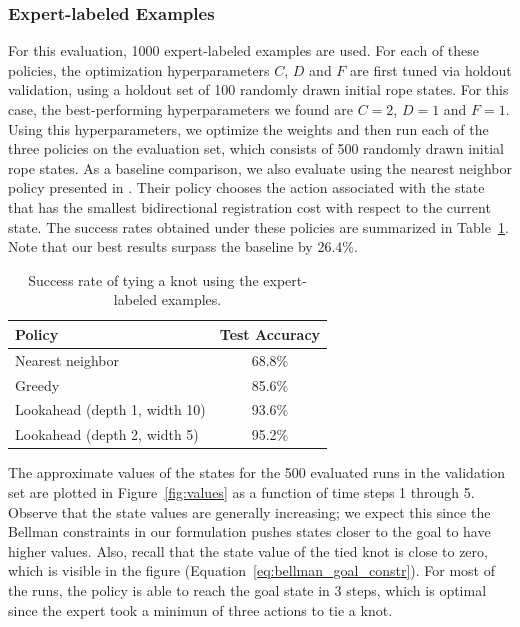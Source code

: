 \subsubsection{Expert-labeled Examples}
For this evaluation, 1000 expert-labeled examples are used.
For each of these policies, the optimization hyperparameters $C$, $D$ and $F$ are first tuned via holdout validation, using a holdout set of 100 randomly drawn initial rope states. For this case, the best-performing hyperparameters we found are $C=2$, $D=1$ and $F=1$.
Using this hyperparameters, we optimize the weights and then run each of the three policies on the evaluation set, which consists of 500 randomly drawn initial rope states.
As a baseline comparison, we also evaluate using the nearest neighbor policy presented in \citet{Schulmanetal_ISRR2013}.
Their policy chooses the action associated with the state that has the smallest bidirectional registration cost with respect to the current state.
The success rates obtained under these policies are summarized in Table~\ref{table:performance}. Note that our best results surpass the baseline by 26.4\%.

\begin{table}
  \centering
  \begin{tabular}{lc}
    \toprule
      Policy & Test Accuracy\\
    \midrule
      Nearest neighbor \cite{Schulmanetal_ISRR2013} & 68.8\% \\
    \midrule
      Greedy & 85.6\% \\
      Lookahead (depth 1, width 10) & 93.6\% \\
      Lookahead (depth 2, width 5) & 95.2\% \\
    \bottomrule
  \end{tabular}
  \caption{Success rate of tying a knot using the expert-labeled examples.}
  \label{table:performance}
\end{table}

The approximate values of the states for the 500 evaluated runs in the validation set are plotted in Figure~\ref{fig:values} as a function of time steps 1 through 5.
Observe that the state values are generally increasing; we expect this since the Bellman constraints in our formulation pushes states closer to the goal to have higher values.
Also, recall that the state value of the tied knot is close to zero, which is visible in the figure (Equation~\ref{eq:bellman_goal_constr}).
For most of the runs, the policy is able to reach the goal state in 3 steps, which is optimal since the expert took a minimun of three actions to tie a knot.

